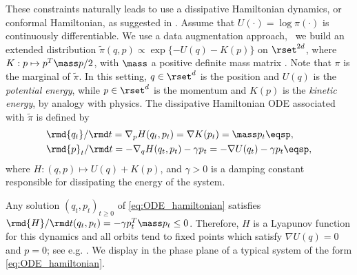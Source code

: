 These constraints naturally leads to use a dissipative Hamiltonian dynamics, or conformal Hamiltonian, as suggested in
\cite{rotskoff:vanden-eijden:2019}.  Assume that $U(\cdot) = \log \pi(\cdot)$ is continuously differentiable. We use a data augmentation approach, \ie\ we build an extended distribution $\tilde\pi(q,p) \propto \exp \{-U(q)-K(p)\}$ on  $\rset^{2d}$, where $K:p\mapsto p^T\mass p/2$, with $\mass$ a positive definite mass matrix . Note that $\pi$ is the marginal of $\tilde{\pi}$. In this setting, $q\in \rset^d$ is the position and $U(q)$ is the {\em potential energy}, while $p\in \rset^d$ is the momentum and $K(p)$ is the {\em kinetic energy}, by analogy with physics. The dissipative Hamiltonian ODE associated with $\tilde \pi$ is defined by %
\begin{align}
  \label{eq:ODE_hamiltonian}
  &\rmd{q_t}/\rmd t =\nabla_{p} H(q_t,p_t) =  \nabla K(p_t) = \mass p_t \eqsp, \\
  \nonumber
&\rmd {p}_t/\rmd t =-\nabla_{q} H(q_t,p_t)-\gamma p_t = -\nabla U(q_t) - \gamma
p_t \eqsp,
\end{align}
where $H:(q,p)\mapsto U(q)+ K(p)$, and $\gamma >0$ is a damping constant
responsible for dissipating the energy of the system.

Any solution $(q_t,p_t)_{t \geq 0}$ of \eqref{eq:ODE_hamiltonian} satisfies $\rmd {H}/\rmd t (q_t,p_t) = - \gamma p_t^T\mass p_t\leq 0$. Therefore, $H$ is a Lyapunov function for this dynamics and all orbits
tend to fixed points which satisfy $\nabla U(q)=0$ and $p=0$; see e.g. \citep[Proposition 2.2]{maddison2018hamiltonian}. We display in  the phase plane of a typical system of the form \eqref{eq:ODE_hamiltonian}. %

